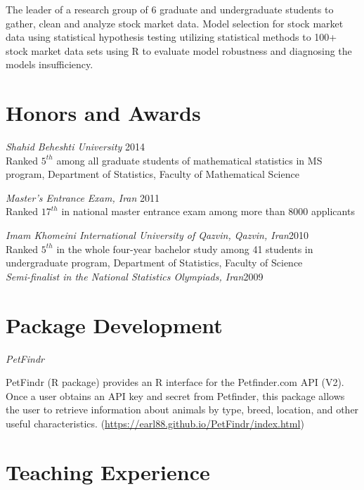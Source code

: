 \documentclass[margin,line]{res}
\begin{document}
\begin{resume}
\vspace{-0.3cm}

The leader of a research group of 6 graduate and undergraduate students to gather, clean and analyze stock market data. Model selection for stock market data using statistical hypothesis testing   utilizing statistical methods to 100+ stock market data sets using R to evaluate model robustness and diagnosing the models insufficiency.
	




\section{\sc Honors and Awards}

{\em Shahid Beheshti University} \hfill 2014\\
 Ranked $5^{th}$ among all graduate students of mathematical statistics in MS program, Department of Statistics, Faculty of Mathematical Science 
 
{\em Master's Entrance Exam, Iran} \hfill 2011\\
Ranked $17^{th}$ in national master entrance exam among more than 8000 applicants 

{\em Imam Khomeini International University of Qazvin, Qazvin, Iran}\hfill 2010\\
Ranked $5^{th}$ in the whole four-year bachelor study among 41 students in undergraduate program, Department of Statistics, Faculty of Science\\

{\em Semi-finalist in the National Statistics Olympiads, Iran}\hfill 2009


\section{\sc Package Development}


{\em PetFindr}

\vspace{-.3cm}
PetFindr (R package) provides an R interface for the Petfinder.com API (V2). Once a user obtains an API key and secret from Petfinder, this package allows the user to retrieve information about animals by type, breed, location, and other useful characteristics. (\url{https://earl88.github.io/PetFindr/index.html})



\section{\sc Teaching Experience}


\end{resume}
\end{document}

